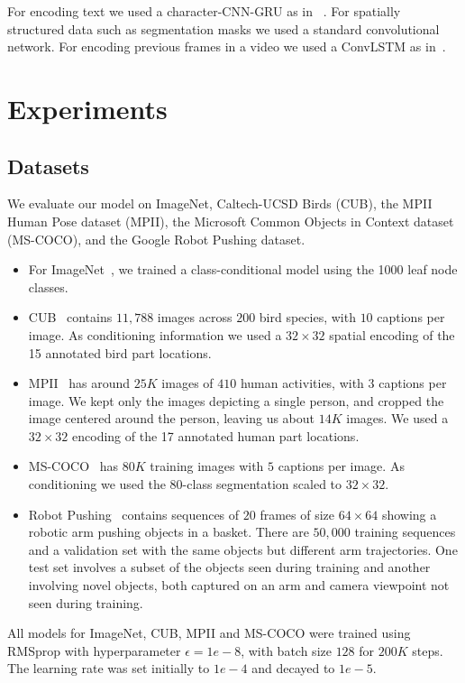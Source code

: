 \documentclass{article}
\begin{document}
For encoding text we used a character-CNN-GRU as in ~\citep{reed2016learning}.
For spatially structured data such as segmentation masks we used a standard convolutional network.
For encoding previous frames in a video we used a ConvLSTM as in~\citep{kalchbrenner2016video}.




\section{Experiments}
\label{sec:experiments}
\subsection{Datasets}
We evaluate our model on ImageNet, Caltech-UCSD Birds (CUB), the MPII Human Pose dataset (MPII), the Microsoft Common Objects in Context dataset (MS-COCO), and the Google Robot Pushing dataset.
\begin{itemize}
\item For ImageNet~\citep{deng2009imagenet}, we trained a class-conditional model using the 1000 leaf node classes.
\item CUB~\citep{wah2011caltech} contains $11,788$ images across $200$ bird species, with $10$ captions
per image. As conditioning information we used a $32 \times 32$ spatial encoding of the 15 annotated bird part locations.
\item MPII~\citep{andriluka20142d} has around $25K$ images of $410$
human activities, with $3$ captions per image.
We kept only the images depicting a single person, and cropped the image centered
around the person, leaving us about $14K$ images. We used a $32 \times 32$ encoding of the 17 annotated human part locations.
\item MS-COCO~\cite{lin2014microsoft} has $80K$ training images with $5$ captions
per image. As conditioning we used the $80$-class segmentation scaled to $32 \times 32$.
\item Robot Pushing~\cite{finn2016unsupervised}  contains sequences of $20$ frames of size $64 \times 64$ showing a robotic arm pushing objects in a basket. There are $50,000$ training sequences and a validation set with the same objects but different arm trajectories. One test set involves a subset of the objects seen during training and another involving novel objects, both captured on an arm and camera viewpoint not seen during training.
\end{itemize}
All models for ImageNet, CUB, MPII and MS-COCO were trained using RMSprop with hyperparameter 
$\epsilon = 1e-8$, with batch size $128$ for $200K$ steps.
The learning rate was set initially to $1e-4$ and decayed to $1e-5$.
\end{document}
